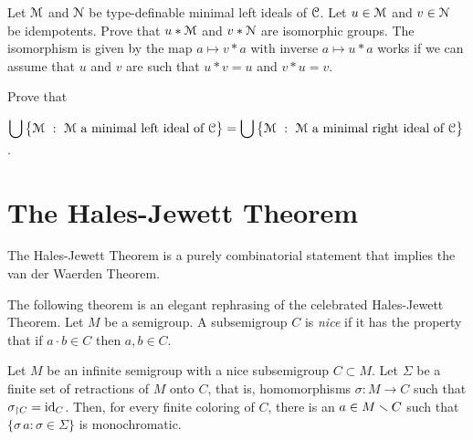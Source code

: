 \begin{exercise}
  Let $\EuScript M$ and $\EuScript N$ be type-definable minimal left ideals of $\EuScript C$.
  Let $u\in\EuScript M$ and $v\in\EuScript N$ be idempotents.
  Prove that $u*\EuScript M$ and $v*\EuScript N$ are isomorphic groups.
  The isomorphism is given by the map $a\mapsto v*a$ with inverse $a\mapsto u*a$ works if we can assume that $u$ and $v$ are such that $u*v=u$ and $v*u=v$.
\end{exercise}

\begin{exercise}
Prove that 

 \hfil$\displaystyle\bigcup\big\{\EuScript M\ :\ \EuScript M\text{ a minimal left ideal of }\EuScript C\big\} =\bigcup\big\{\EuScript M\ :\ \EuScript M\text{ a minimal right ideal of }\EuScript C\big\}$.

\end{exercise}

\section{The Hales-Jewett Theorem}
\label{HJ}

The Hales-Jewett Theorem is a purely combinatorial statement 
that implies the van der Waerden Theorem.

The following theorem is an elegant rephrasing of the celebrated Hales-Jewett Theorem.
Let $M$ be a semigroup.
A subsemigroup $C$ is \emph{nice\/} if it has the property that if $a{\cdot}b\in C$ then $a,b\in C$.

\begin{void}\label{thm_abstract_HJ}
Let $M$ be an infinite semigroup with a nice subsemigroup $C\subset M$.
Let $\Sigma$ be a finite set of retractions of $M$ onto $C$, that is, 
homomorphisms $\sigma:M\to C$ such that $\sigma_{\restriction C}={\rm id}_C$.
Then, for every finite coloring of $C$,
there is an $a\in M\smallsetminus C$ such that $\{\sigma\,a:\sigma\in\Sigma\}$ is monochromatic.
\end{void}

